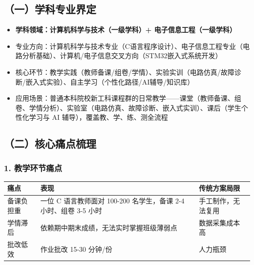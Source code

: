 \documentclass[zihao=-4,a4paper,UTF8,fontset=windows]{ctexart}
\begin{document}
\subsection{（一）学科专业界定}
\begin{itemize}[leftmargin=2em,itemsep=0pt,topsep=0pt]
\item \textbf{学科领域：计算机科学与技术（一级学科）+ 电子信息工程（一级学科）}
\end{itemize}
\begin{itemize}[leftmargin=2em,itemsep=0pt,topsep=0pt]
\item 专业方向：计算机科学与技术专业（C语言程序设计）、电子信息工程专业（电路分析基础）、计算机/电子信息交叉方向（STM32嵌入式系统开发）
\end{itemize}
\begin{itemize}[leftmargin=2em,itemsep=0pt,topsep=0pt]
\item 核心环节：教学实践（教师备课/组卷/学情）、实验实训（电路仿真/故障诊断/嵌入式实验）、自主学习（个性化路径/AI辅导/知识库）
\end{itemize}
\begin{itemize}[leftmargin=2em,itemsep=0pt,topsep=0pt]
\item 应用场景：普通本科院校新工科课程群的日常教学——课堂（教师备课、组卷、学情分析）、实验室（电路仿真、故障诊断、嵌入式实训）、课后（学生个性化学习与 AI 辅导），覆盖教、学、练、测全流程
\end{itemize}
\par\noindent\begin{minipage}{\linewidth}
\subsection{（二）核心痛点梳理}
\subsubsection{1. 教学环节痛点}
\par\noindent\begin{tabular}{|p{3.0cm}|p{4.5cm}|p{6.2cm}|}
\hline
\textbf{痛点} & \textbf{表现} & \textbf{传统方案局限} \\ \hline
备课负担重 & 一位 C 语言教师面对 100-200 名学生，备课 2-4 小时、组卷 3-5 小时 & 手工制作，无法复用 \\ \hline
学情滞后 & 依赖期中期末成绩，无法实时掌握班级薄弱点 & 数据采集成本高 \\ \hline
批改低效 & 作业批改 15-30 分钟/份 & 人力瓶颈 \\ \hline
\end{tabular}\par
\end{minipage}\par
\end{document}
